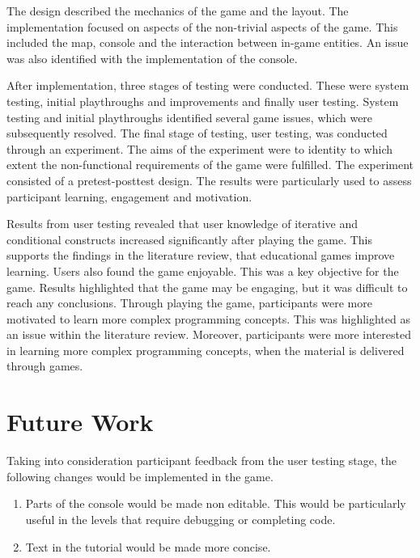 \documentclass[a4paper,11.5pt]{report}
\numberwithin{figure}{section}
\numberwithin{table}{section}
\numberwithin{equation}{section}
\numberwithin{equation}{section}
\newcommand\blankpage{%
    \null
    \thispagestyle{empty}%
    \addtocounter{page}{-1}%
    \newpage}
\begin{document}
The design described the mechanics of the game and the layout. The implementation focused on aspects of the non-trivial aspects of the game. This included the map, console and the interaction between in-game entities. An issue was also identified with the implementation of the console.

After implementation, three stages of testing were conducted. These were system testing, initial playthroughs and improvements and finally user testing. System testing and initial playthroughs identified several game issues, which were subsequently resolved. The final stage of testing, user testing, was conducted through an experiment. The aims of the experiment were to identity to which extent the non-functional requirements of the game were fulfilled. The experiment consisted of a pretest-posttest design. The results were particularly used to assess participant learning, engagement and motivation. 

Results from user testing revealed that user knowledge of iterative and conditional constructs increased significantly after playing the game. This supports the findings in the literature review, that educational games improve learning. Users also found the game enjoyable. This was a key objective for the game. Results highlighted that the game may be engaging, but it was difficult to reach any conclusions. Through playing the game, participants were more motivated to learn more complex programming concepts. This was highlighted as an issue within the literature review. Moreover, participants were more interested in learning more complex programming concepts, when the material is delivered through games.










\afterpage{\blankpage}



\chapter{Future Work}

Taking into consideration participant feedback from the user testing stage, the following changes would be implemented in the game.

\begin{enumerate}
	\item Parts of the console would be made non editable. This would be particularly useful in the levels that require debugging or completing code. 
	\item Text in the tutorial would be made more concise.
\end{enumerate}
\end{document}
